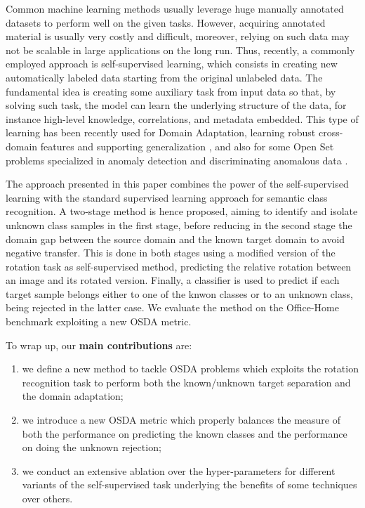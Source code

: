 \documentclass[10pt,twocolumn,letterpaper]{article}
\begin{document}
Common machine learning methods usually leverage huge manually annotated datasets to perform well on the given tasks.
However, acquiring annotated material is usually very costly and difficult, moreover, relying on such data may not be scalable in large applications on the long run.
Thus, recently, a commonly employed approach is self-supervised learning, which consists in creating new automatically labeled data starting from the original unlabeled data.
The fundamental idea is creating some auxiliary task from input data so that,
by solving such task, the model can learn the underlying structure of the data,
for instance high-level knowledge, correlations, and metadata embedded.
This type of learning has been recently used for Domain Adaptation, 
learning robust cross-domain features and supporting generalization \cite{CarlucciJigsaw,SelfSupervisedXu},
and also for some Open Set problems specialized in anomaly detection and discriminating anomalous data \cite{bergman2020classificationbased,GeoTran}. 

The approach presented in this paper combines the power of the self-supervised learning with the standard supervised learning approach for semantic class recognition.
A two-stage method is hence proposed, 
aiming to identify and isolate unknown class samples in the first stage, 
before reducing in the second stage the domain gap between the source domain and the known target domain to avoid negative transfer.
This is done in both stages using a modified version of the rotation task as self-supervised method,
predicting the relative rotation between an image and its rotated version.
Finally, a classifier is used to predict if each target sample belongs either to one of the knwon classes or to an unknown class, 
being rejected in the latter case.
We evaluate the method on the Office-Home benchmark \cite{OfficeHomeDataset} exploiting a new OSDA metric. 

To wrap up, our \textbf{main contributions} are: 
\begin{enumerate}
  \item we define a new method to tackle OSDA problems which exploits the rotation recognition task to perform both the known/unknown target separation
and the domain adaptation;
  \item we introduce a new OSDA metric which properly balances the measure of both the performance on predicting the known classes and the performance on doing the unknown rejection;
  \item we conduct an extensive ablation over the hyper-parameters for different variants of the self-supervised task underlying the benefits of some techniques over others.
\end{enumerate}
\end{document}
